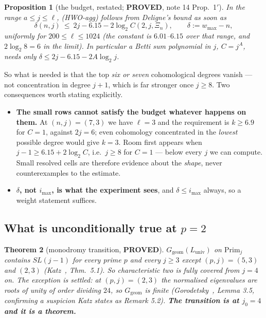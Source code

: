 \documentclass[10pt]{article}
\theoremstyle{plain}
\newtheorem{theorem}{Theorem}[section]
\newtheorem{proposition}[theorem]{Proposition}
\theoremstyle{definition}
\newcommand{\Prim}{\mathrm{Prim}}
\newcommand{\Luniv}{L_{\mathrm{univ}}}
\newcommand{\Ggeom}{G_{\mathrm{geom}}}
\newcommand{\imax}{i_{\max}}
\newcommand{\proved}{\textcolor{proved}{\textsf{\textbf{\footnotesize PROVED}}}}
\begin{document}
\begin{proposition}[the budget, restated; \proved, note 14 Prop.~1$'$]
\label{prop:budget2}
In the range $a\le j\le\ell$, (HWO-agg) follows from Deligne's bound as soon as
\[
 \delta(n,j)\ \le\ 2j-6.15-2\log_2 C(2,j,\Xi_n),
 \qquad
 \delta:=w_{\max}-n,
\]
uniformly for $200\le\ell\le1024$ (the constant is $6.01$--$6.15$ over that
range, and $2\log_2 8=6$ in the limit). In particular a Betti sum polynomial in
$j$, $C=j^A$, needs only $\delta\le2j-6.15-2A\log_2 j$.
\end{proposition}

So what is needed is that the top \emph{six or seven} cohomological degrees
vanish --- not concentration in degree $j+1$, which is far stronger once $j\ge8$.
Two consequences worth stating explicitly.

\begin{itemize}
\item \textbf{The small rows cannot satisfy the budget whatever happens on
them.} At $(n,j)=(7,3)$ we have $\ell=3$ and the requirement is $k\ge6.9$ for
$C=1$, against $2j=6$; even cohomology concentrated in the \emph{lowest}
possible degree would give $k=3$. Room first appears when
$j-1\ge6.15+2\log_2C$, i.e.\ $j\ge8$ for $C=1$ --- below every $j$ we can
compute. Small resolved cells are therefore evidence about the \emph{shape},
never counterexamples to the estimate.
\item \textbf{$\delta$, not $\imax$, is what the experiment sees}, and
$\delta\le\imax$ always, so a weight statement suffices.
\end{itemize}

\subsection{What is unconditionally true at \texorpdfstring{$p=2$}{p = 2}}

\begin{theorem}[monodromy transition, \proved]\label{thm:monodromy}
$\Ggeom(\Luniv)$ on $\Prim_j$ contains $SL(j-1)$ for every prime $p$ and every
$j\ge3$ except $(p,j)=(5,3)$ and $(2,3)$ (Katz~\cite{Katz13}, Thm.~5.1). So
characteristic two is fully covered from $j=4$ on. The exception is settled:
at $(p,j)=(2,3)$ the normalised eigenvalues are roots of unity of order
dividing $24$, so $\Ggeom$ is finite (Gorodetsky~\cite{Gorodetsky19}, Lemma 3.5,
confirming a suspicion Katz states as Remark 5.2). \textbf{The transition is at
$j_0=4$ and it is a theorem.}
\end{theorem}
\end{document}

